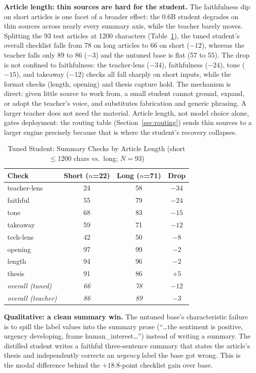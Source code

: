 \documentclass[10pt,journal]{IEEEtran}
\begin{document}
\textbf{Article length: thin sources are hard for the student.}\label{sec:length}
The faithfulness dip on short articles is one facet of a broader effect: the 0.6B student degrades on thin sources across nearly every summary axis, while the teacher barely moves. Splitting the 93 test articles at 1200 characters (Table~\ref{tab:length}), the tuned student's overall checklist falls from 78 on long articles to 66 on short ($-12$), whereas the teacher falls only 89 to 86 ($-3$) and the untuned base is flat (57 to 55). The drop is not confined to faithfulness: the teacher-lens ($-34$), faithfulness ($-24$), tone ($-15$), and takeaway ($-12$) checks all fall sharply on short inputs, while the format checks (length, opening) and thesis capture hold. The mechanism is direct: given little source to work from, a small student cannot ground, expand, or adopt the teacher's voice, and substitutes fabrication and generic phrasing. A larger teacher does not need the material. Article length, not model choice alone, gates deployment: the routing table (Section~\ref{sec:routing}) sends thin sources to a larger engine precisely because that is where the student's recovery collapses.

\begin{table}[t]
\centering
\caption{Tuned Student: Summary Checks by Article Length (short $\leq$1200 chars vs.\ long; $N=93$)}
\label{tab:length}
\small
\begin{tabular}{@{}lccc@{}}
\toprule
Check & Short ($n$=22) & Long ($n$=71) & Drop \\
\midrule
teacher-lens & 24 & 58 & $-34$ \\
faithful & 55 & 79 & $-24$ \\
tone & 68 & 83 & $-15$ \\
takeaway & 59 & 71 & $-12$ \\
tech-lens & 42 & 50 & $-8$ \\
opening & 97 & 99 & $-2$ \\
length & 94 & 96 & $-2$ \\
thesis & 91 & 86 & $+5$ \\
\midrule
\emph{overall (tuned)} & \emph{66} & \emph{78} & \emph{$-12$} \\
\emph{overall (teacher)} & \emph{86} & \emph{89} & \emph{$-3$} \\
\bottomrule
\end{tabular}
\end{table}

\textbf{Qualitative: a clean summary win.} The untuned base's characteristic failure is to spill the label values into the summary prose (``\ldots the sentiment is positive, urgency developing, frame human\_interest\ldots'') instead of writing a summary. The distilled student writes a faithful three-sentence summary that states the article's thesis and independently corrects an \emph{urgency} label the base got wrong. This is the modal difference behind the $+18.8$-point checklist gain over base.
\end{document}
